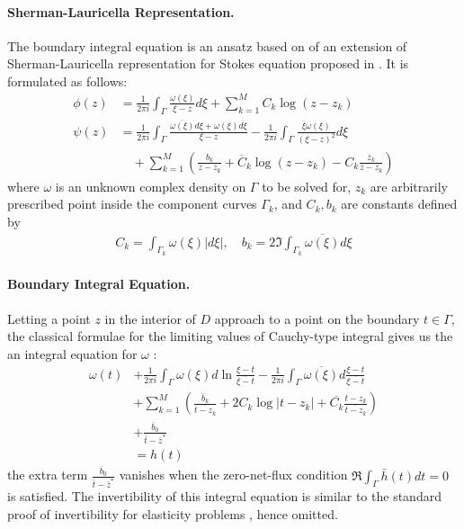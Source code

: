 \documentclass[10pt,twocolumn]{article}
\begin{document}
\paragraph*{Sherman-Lauricella Representation.} The boundary integral equation is an ansatz 
based on of an extension of Sherman-Lauricella representation for Stokes equation 
proposed in \cite{greengardIntegralEquationMethods1996}. 
It is formulated as follows:
\begin{align}
  \phi(z) &=
    \frac {1}{2\pi i} \int_\Gamma \frac{\omega(\xi)}{\xi - z} d\xi  
    + \sum_{k=1}^M C_k \log (z-z_k)
    \\
  \psi(z) &=
    \frac {1}{2\pi i} \int_\Gamma \frac{\overline{\omega(\xi)}d\xi +  \omega(\xi)\overline{d\xi}}{\xi - z}  
    - \frac {1}{2\pi i} \int_\Gamma \frac{\overline{\xi} \omega(\xi)}{(\xi - z)^2} d\xi  
    \\
    & \quad + \sum _{k=1}^M 
    \left( \frac{b_k}{z-z_k} + \overline C_k \log (z-z_k) -  C_k \frac{\overline z_k}{z-z_k} \right) \nonumber 
\end{align}
where $\omega$ is an unknown complex density on $\Gamma$ to be solved for, 
$z_k$ are arbitrarily prescribed point inside the component curves $\Gamma_k$, 
and $C_k, b_k$ are constants defined by 
\begin{align}
  C_k = \int_{\Gamma_k} \omega(\xi) |d\xi|, \quad b_k = 2 \Im\int_{\Gamma_k} \overline{\omega(\xi)} {d\xi}
\end{align}

\paragraph*{Boundary Integral Equation.} 
Letting a point $z$ in the interior of $D$ approach to a point on the boundary $t\in \Gamma$, 
the classical formulae for the limiting values of Cauchy-type integral 
gives us the an integral equation for $\omega$ \cite{muschelisviliSingularIntegralEquations1972,greengardIntegralEquationMethods1996} :
\begin{align}
  \omega(t) 
  &+ \frac 1{2\pi i} \int_{\Gamma} \omega(\xi) d\ln \frac{\xi - t}{\overline{\xi - t}} - \frac 1{2\pi i} \int_\Gamma \overline{\omega(\xi)} d \frac{\xi - t}{\overline{\xi - t}} \label{bie} \\
  &+ \sum_{k=1}^M \left( \frac{\bar b_k}{\overline{t- z_k}} +  2C_k \log |t-z_k| + \overline{C_k} \frac{t-z_k}{\overline{ t - z_k}} \right) \nonumber\\
  &+ \frac{\overline b_0}{\bar t - \bar z^*} \nonumber \\
  &= h(t) \nonumber
\end{align}
the extra term $\frac{\overline b_0}{\bar t - \bar z^*}$ vanishes when the zero-net-flux condition $\Re \int_\Gamma \bar h(t) dt = 0$ is satisfied. 
The invertibility of this integral equation is similar 
to the standard proof of invertibility for elasticity problems \cite{muskhelishviliBasicProblemsMathematical1977}, hence omitted.
\end{document}

